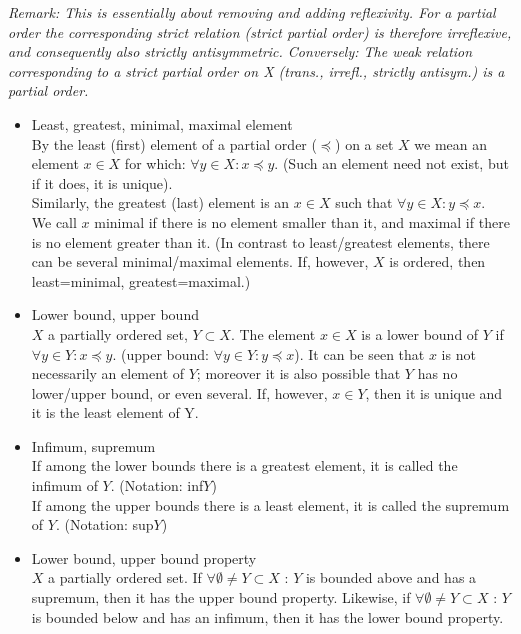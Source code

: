 \documentclass[margin=0px]{article}
\begin{document}
\begin{description}
\begin{itemize}
                  \textit{Remark: This is essentially about removing and adding reflexivity. For a partial order the corresponding strict relation (strict partial order) is therefore irreflexive, and consequently also strictly antisymmetric. Conversely: The weak relation corresponding to a strict partial order on X (trans., irrefl., strictly antisym.) is a partial order. }
        \end{itemize}
    \item[Bounds] \hfill
        \begin{itemize}
            \item Least, greatest, minimal, maximal element \\
                  By the least (first) element of a partial order ($\preccurlyeq$) on a set $X$ we mean an element $x\in X$ for which: $\forall y \in X : x\preccurlyeq y$. (Such an element need not exist, but if it does, it is unique).\\
                  Similarly, the greatest (last) element is an $x\in X$ such that $\forall y \in X : y \preccurlyeq x$.\\

                  We call $x$ minimal if there is no element smaller than it, and maximal if there is no element greater than it. (In contrast to least/greatest elements, there can be several minimal/maximal elements. If, however, $X$ is ordered, then least=minimal, greatest=maximal.)
            \item Lower bound, upper bound \\
                  $X$ a partially ordered set, $Y \subset X$. The element $x \in X$ is a lower bound of $Y$ if $\forall y \in Y : x \preccurlyeq y$. (upper bound: $\forall y \in Y : y \preccurlyeq x$). It can be seen that $x$ is not necessarily an element of $Y$; moreover it is also possible that $Y$ has no lower/upper bound, or even several. If, however, $x\in Y$, then it is unique and it is the least element of Y.
            \item Infimum, supremum \\
                  If among the lower bounds there is a greatest element, it is called the infimum of $Y$. (Notation: inf$Y$) \\
                  If among the upper bounds there is a least element, it is called the supremum of $Y$. (Notation: sup$Y$)
            \item Lower bound, upper bound property \\
                  $X$ a partially ordered set. If $ \forall \emptyset \neq Y \subset X$ : $Y$ is bounded above and has a supremum, then it has the upper bound property.
                  Likewise, if $ \forall \emptyset \neq Y \subset X$ : $Y$ is bounded below and has an infimum, then it has the lower bound property.
        \end{itemize}
\end{description}
\end{document}
